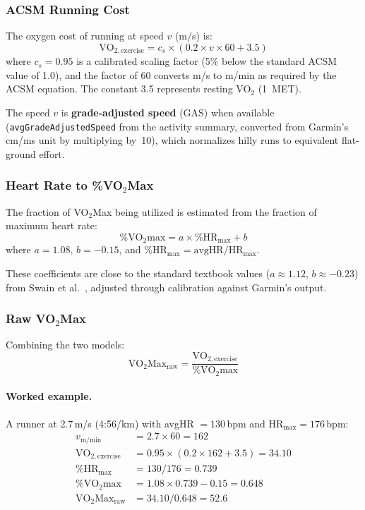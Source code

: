 \documentclass[11pt,a4paper]{article}
\begin{document}
\subsubsection{ACSM Running Cost}

The oxygen cost of running at speed $v$ (m/s) is:
\begin{equation}
\text{VO}_{2,\text{exercise}} = c_s \times (0.2 \times v \times 60 + 3.5)
\label{eq:acsm}
\end{equation}
where $c_s = 0.95$ is a calibrated scaling factor (5\% below the standard ACSM value of 1.0), and the factor of 60 converts m/s to m/min as required by the ACSM equation.
The constant 3.5 represents resting VO$_2$ (1~MET).

The speed $v$ is \textbf{grade-adjusted speed} (GAS) when available (\texttt{avgGrade\-AdjustedSpeed} from the activity summary, converted from Garmin's cm/ms unit by multiplying by~10), which normalizes hilly runs to equivalent flat-ground effort.

\subsubsection{Heart Rate to \%VO$_2$Max}

The fraction of VO$_2$Max being utilized is estimated from the fraction of maximum heart rate:
\begin{equation}
\%\text{VO}_2\text{max} = a \times \%\text{HR}_{\text{max}} + b
\label{eq:hrmax-model}
\end{equation}
where $a = 1.08$, $b = -0.15$, and $\%\text{HR}_{\text{max}} = \text{avgHR} / \text{HR}_{\text{max}}$.

These coefficients are close to the standard textbook values ($a \approx 1.12$, $b \approx -0.23$) from Swain et al.~\cite{swain1994}, adjusted through calibration against Garmin's output.

\subsubsection{Raw VO$_2$Max}

Combining the two models:
\begin{equation}
\text{VO}_2\text{Max}_{\text{raw}} = \frac{\text{VO}_{2,\text{exercise}}}{\%\text{VO}_2\text{max}}
\label{eq:raw-vo2max}
\end{equation}

\paragraph{Worked example.}
A runner at 2.7\,m/s (4:56/km) with avgHR $= 130$\,bpm and HR$_{\text{max}} = 176$\,bpm:
\begin{align*}
v_{\text{m/min}} &= 2.7 \times 60 = 162 \\
\text{VO}_{2,\text{exercise}} &= 0.95 \times (0.2 \times 162 + 3.5) = 34.10 \\
\%\text{HR}_{\text{max}} &= 130 / 176 = 0.739 \\
\%\text{VO}_2\text{max} &= 1.08 \times 0.739 - 0.15 = 0.648 \\
\text{VO}_2\text{Max}_{\text{raw}} &= 34.10 / 0.648 = 52.6
\end{align*}
\end{document}
